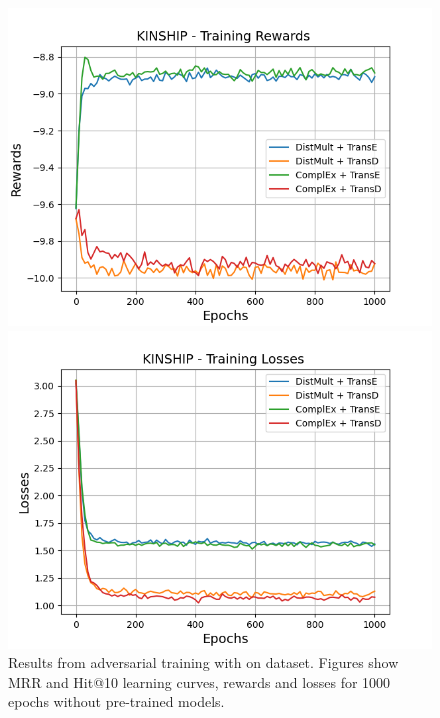 \begin{figure}[H]
    \begin{minipage}{.5\textwidth}
      \centering
      \includegraphics[width=\linewidth]{figures/results/gan_train/not_pretrained/uncertainty/max_distribution/entropy/kinship/1k_epochs/uncertainty_kinship_rew.png}
    \end{minipage}%
     \begin{minipage}{.5\textwidth}
      \centering
      \includegraphics[width=\linewidth]{figures/results/gan_train/not_pretrained/uncertainty/max_distribution/entropy/kinship/1k_epochs/uncertainty_kinship_losses.png}
    \end{minipage}%
    \caption{Results from adversarial training with \ussoftmax on \kinship dataset.
    Figures show MRR and Hit@10 learning curves, rewards and losses for 1000 epochs without pre-trained models.}
    \label{fig:gan_train_not_pretrained_ussoftmax_kinship}
\end{figure}
